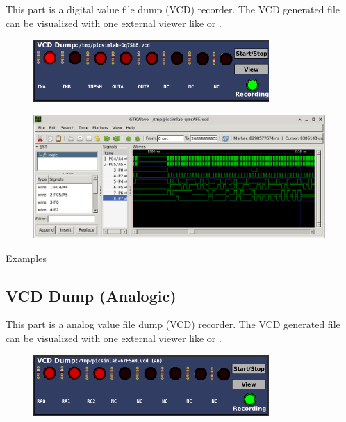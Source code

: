 This part is a digital value file dump (VCD) recorder. The VCD generated file can be visualized with one external viewer like 
 or . 

\begin{figure}[H]
\center
\includegraphics[width=0.8\textwidth]{img/part_vcd_dump.png} 
\end{figure}



\begin{figure}[H]
\center
\includegraphics[width=0.99\textwidth]{img/part_vcd_dump_gtkwave.png} 
\end{figure}

\href{https://lcgamboa.github.io/picsimlab_examples/parts_VCD_Dump.html}{Examples}


\subsection{VCD Dump (Analogic)}


This part is a analog value file dump (VCD) recorder. The VCD generated file can be visualized with one external viewer like 
 or .  

\begin{figure}[H]
\center
\includegraphics[width=0.8\textwidth]{img/part_vcd_dump_an.png} 
\end{figure}



